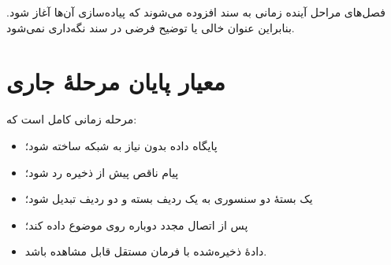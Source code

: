 فصل‌های مراحل آینده زمانی به سند افزوده می‌شوند که پیاده‌سازی آن‌ها آغاز شود. بنابراین عنوان خالی یا توضیح فرضی در سند نگه‌داری نمی‌شود.

\section{معیار پایان مرحلهٔ جاری}
مرحله زمانی کامل است که:

\begin{itemize}
  \item پایگاه داده بدون نیاز به شبکه ساخته شود؛
  \item پیام ناقص پیش از ذخیره رد شود؛
  \item یک بستهٔ دو سنسوری به یک ردیف بسته و دو ردیف
  تبدیل شود؛
  \item
  پس از اتصال مجدد دوباره روی موضوع داده
  کند؛
  \item دادهٔ ذخیره‌شده با فرمان مستقل قابل مشاهده باشد.
\end{itemize}
